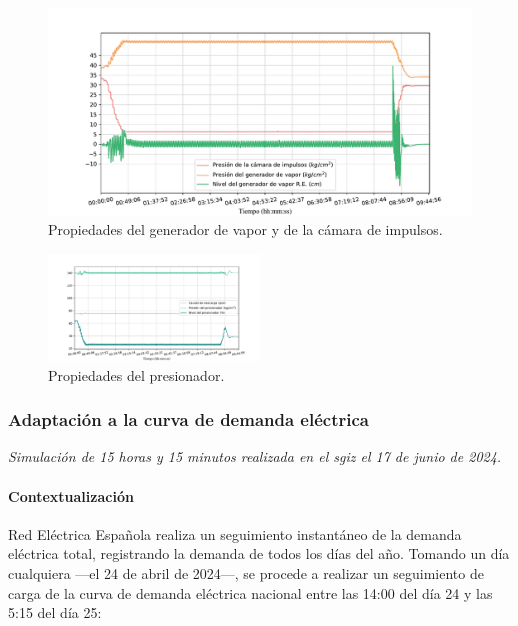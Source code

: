\begin{figure}[!h]
  \centering
  \includegraphics[width=\textwidth]{content/figures/sim3_gen_vapor_camara_imp.pdf}
  \caption{Propiedades del generador de vapor y de la cámara de impulsos.}
  \label{fig:sim3_gen_vapor_camara_imp}
\end{figure}

\begin{figure}[!h]
  \centering
  \includegraphics[width=0.5\textwidth]{content/figures/sim3_presionador.pdf}
  \caption{Propiedades del presionador.}
  \label{fig:sim3_presionador}
\end{figure}


\newpage
\subsubsection{Adaptación a la curva de demanda eléctrica}

\textit{Simulación de 15 horas y 15 minutos realizada en el \acrshort{sgiz} el 17 de junio de 2024.}

\paragraph{Contextualización}

Red Eléctrica Española realiza un seguimiento instantáneo de la demanda eléctrica total, registrando la demanda de todos los días del año. Tomando un día cualquiera ---el 24 de abril de 2024---, se procede a realizar un seguimiento de carga de la curva de demanda eléctrica nacional entre las 14:00 del día 24 y las 5:15 del día 25:

